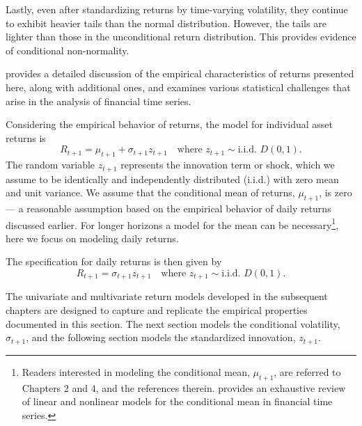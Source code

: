 Lastly, even after standardizing returns by time-varying volatility, they continue to exhibit heavier tails than the normal distribution. However, the tails are lighter than those in the unconditional return distribution. This provides evidence of conditional non-normality.

 provides a detailed discussion of the empirical characteristics of returns presented here, along with additional ones, and examines various statistical challenges that arise in the analysis of financial time series.

Considering the empirical behavior of returns, the model for individual asset returns is
\begin{equation}
R_{t+1}=\mu_{t+1} +\sigma_{t+1}z_{t+1} \quad \text{where } z_{t+1} \sim \text{i.i.d. } D(0,1).
\label{eq:1.1}
\end{equation}
The random variable $z_{t+1}$ represents the innovation term or shock, which we assume to be identically and independently distributed (i.i.d.) with zero mean and unit variance. We assume that the conditional mean of returns, $\mu_{t+1}$, is zero — a reasonable assumption based on the empirical behavior of daily returns discussed earlier. For longer horizons a model for the mean can be necessary\footnote{Readers interested in modeling the conditional mean, $\mu_{t+1}$, are referred to  Chapters 2 and 4, and the references therein.  provides an exhaustive review of linear and nonlinear models for the conditional mean in financial time series.}, here we focus on modeling daily returns. 

The specification for daily returns is then given by
\begin{equation}
    R_{t+1}=\sigma_{t+1}z_{t+1} \quad \text{where } z_{t+1} \sim \text{i.i.d. } D(0,1).
    \label{eq:1.2}
\end{equation}

\newpage
The univariate and multivariate return models developed in the subsequent chapters are designed to capture and replicate the empirical properties documented in this section. The next section models the conditional volatility, $\sigma_{t+1}$, and the following section models the standardized innovation, $z_{t+1}$.
